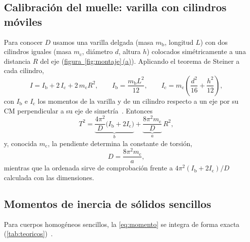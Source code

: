 \documentclass[a4paper,11pt]{amsart}
\numberwithin{equation}{section}
\newcommand{\Ib}{I_{\mathrm{b}}}              %
\newcommand{\Ic}{I_{\mathrm{c}}}              %
\newcommand{\mb}{m_{\mathrm{b}}}
\newcommand{\mc}{m_{\mathrm{c}}}
\theoremstyle{cienplano}
\theoremstyle{ciendef}
\theoremstyle{cienobs}
\newcommand{\figpanel}[2]{\hyperref[#1]{figura~\ref*{#1}\,\textup{(#2)}}}
\begin{document}
\subsection{Calibración del muelle: varilla con cilindros móviles}\label{sec:calibracion}
Para conocer $D$ usamos una varilla delgada (masa $\mb$, longitud $L$) con
dos cilindros iguales (masa $\mc$, diámetro $d$, altura $h$) colocados
simétricamente a una distancia $R$ del eje (\figpanel{fig:montaje}{a}).
Aplicando el teorema de Steiner a cada cilindro,
\begin{equation}\label{eq:Ivarilla}
  I=\Ib+2\,\Ic+2\,\mc R^{2},
  \qquad
  \Ib=\frac{\mb L^{2}}{12},
  \qquad
  \Ic=\mc\left(\frac{d^{2}}{16}+\frac{h^{2}}{12}\right),
\end{equation}
con $\Ib$ e $\Ic$ los momentos de la varilla y de un cilindro respecto a un
eje por su CM perpendicular a su eje de simetría~\cite{FI-FAB,GUION-P1}.
Entonces
\begin{equation}\label{eq:varilla}
  T^{2}=\underbrace{\frac{4\pi^{2}}{D}\bigl(\Ib+2\Ic\bigr)}_{b}
       +\underbrace{\frac{8\pi^{2}\mc}{D}}_{a}\,R^{2},
\end{equation}
y, conocida $\mc$, la pendiente determina la constante de torsión,
\begin{equation}\label{eq:D}
  D=\frac{8\pi^{2}\mc}{a},
\end{equation}
mientras que la ordenada sirve de comprobación frente a
$4\pi^{2}(\Ib+2\Ic)/D$ calculada con las dimensiones.

\subsection{Momentos de inercia de sólidos sencillos}\label{sec:solidos}
Para cuerpos homogéneos sencillos, la \cref{eq:momento} se integra de forma
exacta (\cref{tab:teoricos})~\cite{ALONSO,FI-FAB,FI-DMG}.
\end{document}
